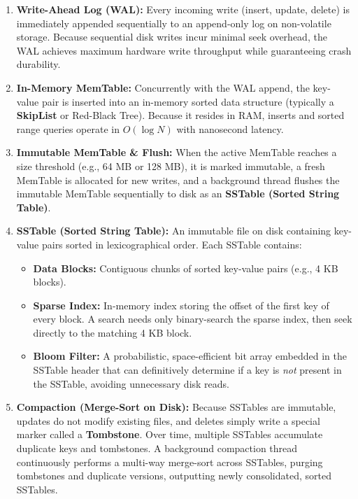 \documentclass[10pt,journal,compsoc,onecolumn]{IEEEtran}
\begin{document}
\begin{enumerate}
    \item \textbf{Write-Ahead Log (WAL):} Every incoming write (insert, update, delete) is immediately appended sequentially to an append-only log on non-volatile storage. Because sequential disk writes incur minimal seek overhead, the WAL achieves maximum hardware write throughput while guaranteeing crash durability.
    \item \textbf{In-Memory MemTable:} Concurrently with the WAL append, the key-value pair is inserted into an in-memory sorted data structure (typically a \textbf{SkipList} or Red-Black Tree). Because it resides in RAM, inserts and sorted range queries operate in $O(\log N)$ with nanosecond latency.
    \item \textbf{Immutable MemTable \& Flush:} When the active MemTable reaches a size threshold (e.g., 64 MB or 128 MB), it is marked immutable, a fresh MemTable is allocated for new writes, and a background thread flushes the immutable MemTable sequentially to disk as an \textbf{SSTable (Sorted String Table)}.
    \item \textbf{SSTable (Sorted String Table):} An immutable file on disk containing key-value pairs sorted in lexicographical order. Each SSTable contains:
    \begin{itemize}
        \item \textbf{Data Blocks:} Contiguous chunks of sorted key-value pairs (e.g., 4 KB blocks).
        \item \textbf{Sparse Index:} In-memory index storing the offset of the first key of every block. A search needs only binary-search the sparse index, then seek directly to the matching 4 KB block.
        \item \textbf{Bloom Filter:} A probabilistic, space-efficient bit array embedded in the SSTable header that can definitively determine if a key is \emph{not} present in the SSTable, avoiding unnecessary disk reads.
    \end{itemize}
    \item \textbf{Compaction (Merge-Sort on Disk):} Because SSTables are immutable, updates do not modify existing files, and deletes simply write a special marker called a \textbf{Tombstone}. Over time, multiple SSTables accumulate duplicate keys and tombstones. A background compaction thread continuously performs a multi-way merge-sort across SSTables, purging tombstones and duplicate versions, outputting newly consolidated, sorted SSTables.
\end{enumerate}
\end{document}
